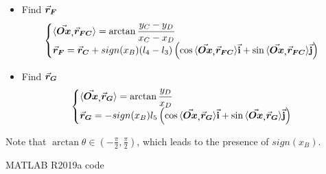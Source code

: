 \begin{frame}
	\begin{itemize}
		\item Find $\vec{\bm{r}}_{\bm{F}}$
		\[\begin{cases}
		\displaystyle \langle \vec{\bm{Ox}}_{\bm{,}} \vec{\bm{r}}_{\bm{FC}}\rangle = \arctan{\frac{y_C-y_D}{x_C-x_D}}\\
		\displaystyle\vec{\bm{r}}_{\bm{F}} = \vec{\bm{r}}_{\bm{C}}+sign(x_B)(l_4-l_3)\left(\cos{\langle \vec{\bm{Ox}}_{\bm{,}}\vec{\bm{r}}_{\bm{FC}}\rangle\vec{\mathbf{i}}} + \sin{\langle \vec{\bm{Ox}}_{\bm{,}}\vec{\bm{r}}_{\bm{FC}}\rangle\vec{\mathbf{j}}}\right)
		\end{cases}\]
		\item Find $\vec{\bm{r}}_{\bm{G}}$
		\[\begin{cases}
		\displaystyle \langle \vec{\bm{Ox}}_{\bm{,}} \vec{\bm{r}}_{\bm{G}}\rangle = \arctan{\frac{y_D}{x_D}}\\
		\displaystyle\vec{\bm{r}}_{\bm{G}} = -sign(x_B)l_5\left(\cos{\langle \vec{\bm{Ox}}_{\bm{,}}\vec{\bm{r}}_{\bm{G}}\rangle\vec{\mathbf{i}}}+\sin{\langle \vec{\bm{Ox}}_{\bm{,}}\vec{\bm{r}}_{\bm{G}}\rangle\vec{\mathbf{j}}}\right)
		\end{cases}\]
	\end{itemize}
Note that $\arctan{\theta}\in(-\frac{\pi}{2}, \frac{\pi}{2})$, which leads to the presence of $sign(x_B)$.
\end{frame}


\begin{frame}{MATLAB R2019a code}

\end{frame}


